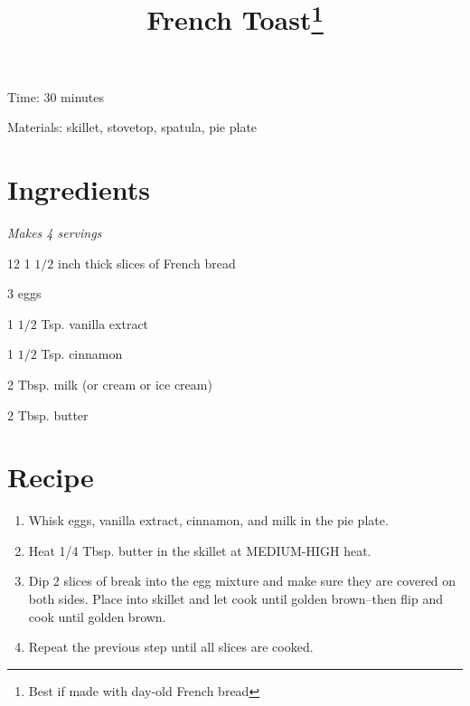 \documentclass{article}
\title{French Toast\footnote{Best if made with day-old French bread}}
\begin{document}
Time: 30 minutes

Materials: skillet, stovetop, spatula, pie plate

\section{Ingredients}
\textit{Makes 4 servings}

12 1 $1/2$ inch thick slices of French bread

3 eggs

1 $1/2$ Tsp. vanilla extract

1 $1/2$ Tsp. cinnamon

2 Tbsp. milk (or cream or ice cream)

2 Tbsp. butter

\section{Recipe}
\begin{enumerate}
\item{Whisk eggs, vanilla extract, cinnamon, and milk in the pie plate.}
\item{Heat 1/4 Tbsp. butter in the skillet at MEDIUM-HIGH heat.}
\item{Dip 2 slices of break into the egg mixture and make sure they are covered on both sides. Place into skillet and let cook until golden brown--then flip and cook until golden brown.}
\item{Repeat the previous step until all slices are cooked.}
\end{enumerate}
\end{document}
